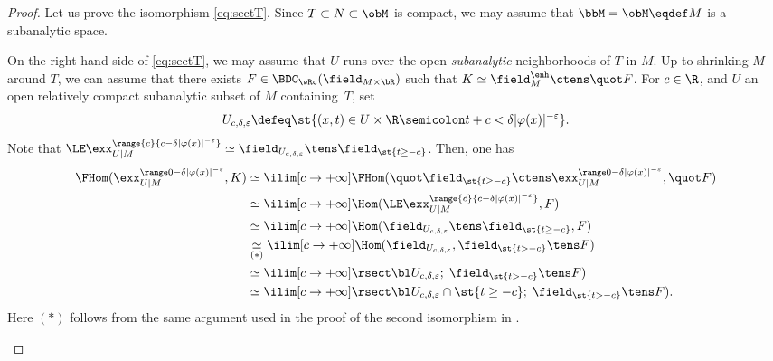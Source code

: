 \begin{proof}
Let us prove the isomorphism \eqref{eq:sectT}. Since $T\subset N\subset \obM$ is compact,
we may assume that $\bbM=\obM\eqdef M$ is a subanalytic space.

\begin{enumeratei}
\item\label{pf:i}
On the right hand side of \eqref{eq:sectT}, we may assume that $U$ runs over the open \emph{subanalytic} neighborhoods of $T$ in $M$.
Up to shrinking $M$ around $T$, we can assume that there exists $F\in\BDC_\wRc
(\field_{M\times\bR})$ such that $K \simeq \field_M^\enh\ctens \quot F$. For $c\in\R$, and $U$ an open relatively compact subanalytic subset of $M$ containing~$T$, set
\[
U_{c,\delta,\varepsilon} \defeq \st{(x,t)\in U\times\R \semicolon t+c<\delta|\varphi(x)|^{-\varepsilon}}.
\]
Note that $\LE \exx^{\range{c}{c-\delta|\varphi(x)|^{-\varepsilon}}}_{U|M} \simeq \field_{U_{c,\delta,\varepsilon}}\tens\field_{\st{ t\geq -c}}$.
Then, one has
\begin{align*}
\FHom(\exx^{\range0{-\delta|\varphi(x)|^{-\varepsilon}}}_{U|M},K)
&\simeq
\ilim[c\to+\infty]\FHom(\quot\field_{\st{t\geq -c}}\ctens\exx^{\range0{-\delta|\varphi(x)|^{-\varepsilon}}}_{U|M},\quot F) \\
&\simeq
\ilim[c\to+\infty]\Hom(\LE\exx^{\range{c}{c-\delta|\varphi(x)|^{-\varepsilon}}}_{U|M},F) \\
&\simeq
\ilim[c\to+\infty]\Hom(\field_{U_{c,\delta,\varepsilon}}\tens\field_{\st{t\geq -c}}, F) \\
&\underset{(*)}\simeq \ilim[c\to+\infty]\Hom(\field_{U_{c,\delta,\varepsilon}},\field_{\st{t> -c}}\tens F) \\
&\simeq
\ilim[c\to+\infty]\rsect\bl U_{c,\delta,\varepsilon};\;\field_{\st{t> -c}}\tens F)\\
&\simeq
\ilim[c\to+\infty]\rsect\bl U_{c,\delta,\varepsilon}\cap\st{t\ge-c};\;\field_{\st{t> -c}}\tens F).
\end{align*}
Here $(*)$ follows from the same argument used in the proof of the second isomorphism in \cite[(6.6.2)]{KS16}.


\end{enumeratei}
\end{proof}

